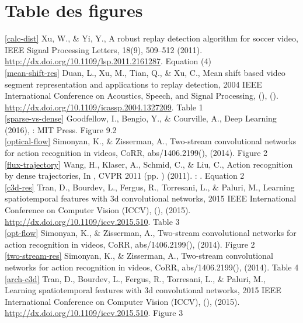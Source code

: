 \documentclass[11pt]{article}
\begin{document}
\newpage
\section{Table des figures}
\label{sec:org4baf432}
\ref{calc-dist} Xu, W., \& Yi, Y., A robust replay detection algorithm for soccer video, IEEE Signal Processing Letters, 18(9), 509–512 (2011).  \url{http://dx.doi.org/10.1109/lsp.2011.2161287}. Equation (4)\\

\ref{mean-shift-res} Duan, L., Xu, M., Tian, Q., \& Xu, C., Mean shift based video segment representation and applications to replay detection, 2004 IEEE International Conference on Acoustics, Speech, and Signal Processing, (),  ().  \url{http://dx.doi.org/10.1109/icassp.2004.1327209}. Table 1\\

\ref{sparse-vs-dense} Goodfellow, I., Bengio, Y., \& Courville, A., Deep Learning (2016), : MIT Press. \cite{Goodfellow-et-al-2016} Figure 9.2\\

\ref{optical-flow} Simonyan, K., \& Zisserman, A., Two-stream convolutional networks for action recognition in videos, CoRR, abs/1406.2199(),  (2014). Figure 2\\

\ref{flux-trajectory} Wang, H., Klaser, A., Schmid, C., \& Liu, C., Action recognition by dense trajectories, In , CVPR 2011 (pp. ) (2011). : . Equation 2\\

\ref{c3d-res} Tran, D., Bourdev, L., Fergus, R., Torresani, L., \& Paluri, M., Learning spatiotemporal features with 3d convolutional networks, 2015 IEEE International Conference on Computer Vision (ICCV), (),  (2015).  \url{http://dx.doi.org/10.1109/iccv.2015.510}. Table 3\\

\ref{opt-flow} Simonyan, K., \& Zisserman, A., Two-stream convolutional networks for action recognition in videos, CoRR, abs/1406.2199(),  (2014). Figure 2\\

\ref{two-stream-res} Simonyan, K., \& Zisserman, A., Two-stream convolutional networks for action recognition in videos, CoRR, abs/1406.2199(),  (2014). Table 4\\

\ref{arch-c3d} Tran, D., Bourdev, L., Fergus, R., Torresani, L., \& Paluri, M., Learning spatiotemporal features with 3d convolutional networks, 2015 IEEE International Conference on Computer Vision (ICCV), (),  (2015).  \url{http://dx.doi.org/10.1109/iccv.2015.510}. Figure 3\\
\end{document}
